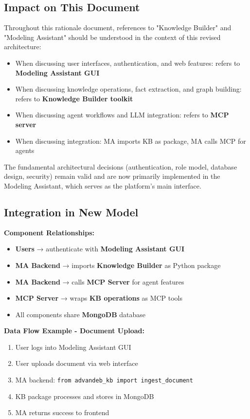 \documentclass[12pt,a4paper]{article}
\begin{document}
\subsection{Impact on This Document}

Throughout this rationale document, references to "Knowledge Builder" and "Modeling Assistant" should be understood in the context of this revised architecture:

\begin{itemize}[noitemsep]
    \item When discussing user interfaces, authentication, and web features: refers to \textbf{Modeling Assistant GUI}
    \item When discussing knowledge operations, fact extraction, and graph building: refers to \textbf{Knowledge Builder toolkit}
    \item When discussing agent workflows and LLM integration: refers to \textbf{MCP server}
    \item When discussing integration: MA imports KB as package, MA calls MCP for agents
\end{itemize}

The fundamental architectural decisions (authentication, role model, database design, security) remain valid and are now primarily implemented in the Modeling Assistant, which serves as the platform's main interface.

\subsection{Integration in New Model}

\textbf{Component Relationships:}
\begin{itemize}[noitemsep]
    \item \textbf{Users} → authenticate with \textbf{Modeling Assistant GUI}
    \item \textbf{MA Backend} → imports \textbf{Knowledge Builder} as Python package
    \item \textbf{MA Backend} → calls \textbf{MCP Server} for agent features
    \item \textbf{MCP Server} → wraps \textbf{KB operations} as MCP tools
    \item All components share \textbf{MongoDB} database
\end{itemize}

\textbf{Data Flow Example - Document Upload:}
\begin{enumerate}[noitemsep]
    \item User logs into Modeling Assistant GUI
    \item User uploads document via web interface
    \item MA backend: \texttt{from advandeb\_kb import ingest\_document}
    \item KB package processes and stores in MongoDB
    \item MA returns success to frontend
\end{enumerate}
\end{document}
